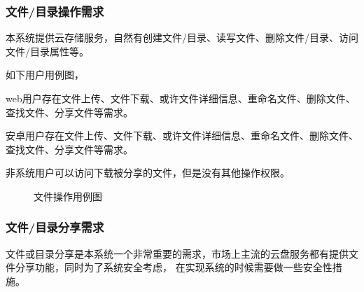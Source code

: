 \subsubsection{文件/目录操作需求}
本系统提供云存储服务，自然有创建文件/目录、读写文件、删除文件/目录、访问文件/目录属性等。

如下用户用例图，

web用户存在文件上传、文件下载、或许文件详细信息、重命名文件、删除文件、查找文件、分享文件等需求。

安卓用户存在文件上传、文件下载、或许文件详细信息、重命名文件、删除文件、查找文件、分享文件等需求。

非系统用户可以访问下载被分享的文件，但是没有其他操作权限。

\begin{figure}[htbp]
  \centering
  \centering
  \caption{文件操作用例图}
  \end{figure}
\subsubsection{文件/目录分享需求}
文件或目录分享是本系统一个非常重要的需求，市场上主流的云盘服务都有提供文件分享功能，同时为了系统安全考虑，
在实现系统的时候需要做一些安全性措施。

